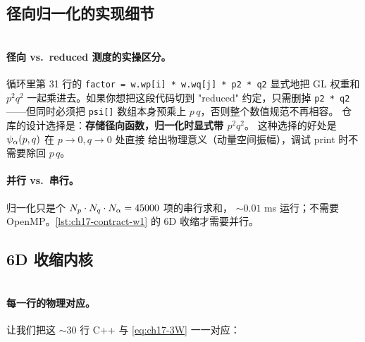 \subsection{径向归一化的实现细节}
\label{subsec:ch17-code-norm}

\begin{lstlisting}[style=cpp, caption={\texttt{compute\_norm\_radial} —— 显式的 \(p^2 q^2\) 测度 (lines 22--39)}, label={lst:ch17-compute-norm}]
\end{lstlisting}


\paragraph{径向 vs.\ reduced 测度的实操区分。}
循环里第 31 行的 \texttt{factor = w.wp[i] * w.wq[j] * p2 * q2}
显式地把 GL 权重和 \(p^2 q^2\) 一起乘进去。如果你想把这段代码切到
"reduced" 约定，只需删掉 \texttt{p2 * q2}——但同时必须把
\texttt{psi[]} 数组本身预乘上 \(p\,q\)，否则整个数值规范不再相容。
仓库的设计选择是：\textbf{存储径向函数，归一化时显式带 \(p^2 q^2\)}。
这种选择的好处是 \(\psi_\alpha(p, q)\) 在 \(p \to 0, q \to 0\) 处直接
给出物理意义（动量空间振幅），调试 print 时不需要除回 \(p\,q\)。

\paragraph{并行 vs.\ 串行。}
归一化只是个 \(N_p \cdot N_q \cdot N_\alpha = 45000\) 项的串行求和，
\(\sim 0.01\) ms 运行；不需要 OpenMP。\cref{lst:ch17-contract-w1} 的
6D 收缩才需要并行。

\subsection{6D 收缩内核}
\label{subsec:ch17-code-contract}

\begin{lstlisting}[style=cpp, caption={\texttt{contract\_W1\_expectation} —— 6D 期望值收缩 (lines 1--43)}, label={lst:ch17-contract-w1}]
\end{lstlisting}


\paragraph{每一行的物理对应。}
让我们把这 \(\sim 30\) 行 C++ 与 \cref{eq:ch17-3W} 一一对应：

